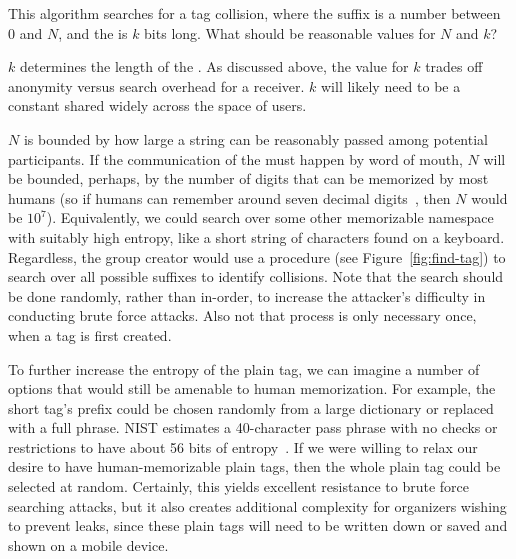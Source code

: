 %
This algorithm searches for a tag collision, where the 
suffix is a number between 0 and $N$, and the  is $k$ bits
long.  What should be reasonable values for $N$ and $k$?

$k$ determines the length of the . As discussed above, the
value for $k$ trades off anonymity versus search overhead for a
receiver. $k$ will likely need to be a constant shared widely across the
space of \hoot users.

$N$ is bounded by how large a  string can be reasonably
passed among potential \hoot participants. If the communication of the
 must happen by word of mouth, $N$ will be bounded,
perhaps, by the number of digits that can be memorized by most humans
(so if humans can remember around seven decimal digits~\cite{miller56},
then $N$ would be $10^7$). Equivalently, we could search over some other
memorizable namespace with suitably high entropy, like a short string of
characters found on a keyboard.  Regardless, the group creator would use
a  procedure (see Figure~\ref{fig:find-tag}) to search
over all possible suffixes to identify collisions. Note that the search
should be done randomly, rather than in-order, to increase the
attacker's difficulty in conducting brute force attacks. Also not that
process is only necessary once, when a tag is first created.

To further increase the entropy of the plain tag, we can imagine a
number of options that would still be amenable to human
memorization. For example, the short tag's prefix could be chosen
randomly from a large dictionary or replaced with a full phrase. NIST
estimates a 40-character pass phrase with no checks or restrictions to
have about 56 bits of entropy~\cite{nist}. If we were willing to relax
our desire to have human-memorizable plain tags, then the whole plain
tag could be selected at random. Certainly, this yields excellent
resistance to brute force searching attacks, but it also creates
additional complexity for organizers wishing to prevent leaks, since
these plain tags will need to be written down or saved and shown on a
mobile device.

